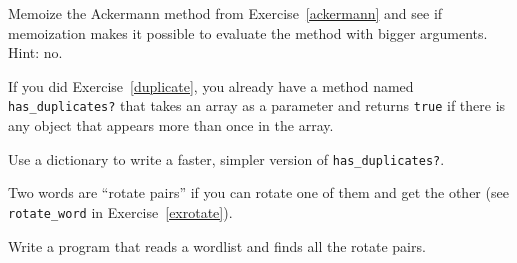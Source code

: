 \documentclass[10pt]{book}
\begin{document}
\begin{exercise}
Memoize the Ackermann method from Exercise~\ref{ackermann} and see if
memoization makes it possible to evaluate the method with bigger
arguments.  Hint: no.

\end{exercise}



\begin{exercise}

If you did Exercise~\ref{duplicate}, you already have
a method named \verb"has_duplicates?" that takes an array
as a parameter and returns {\tt true} if there is any object
that appears more than once in the array.

Use a dictionary to write a faster, simpler version of
\verb"has_duplicates?". 

\end{exercise}


\begin{exercise}
\label{exrotatepairs}

Two words are ``rotate pairs'' if you can rotate one of them
and get the other (see \verb"rotate_word" in Exercise~\ref{exrotate}).

Write a program that reads a wordlist and finds all the rotate
pairs.

\end{exercise}
\end{document}
